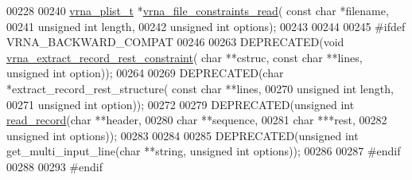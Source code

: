 \begin{DoxyCode}
00228 
00240 \hyperlink{group__data__structures_structvrna__plist__s}{vrna\_plist\_t} *\hyperlink{group__file__utils_gae33323c53765ecbbc410d9de2d495432}{vrna\_file\_constraints\_read}( \textcolor{keyword}{const} \textcolor{keywordtype}{char} *filename,
00241                                           \textcolor{keywordtype}{unsigned} \textcolor{keywordtype}{int} length,
00242                                           \textcolor{keywordtype}{unsigned} \textcolor{keywordtype}{int} options);
00243 
00244 
00245 \textcolor{preprocessor}{#ifdef  VRNA\_BACKWARD\_COMPAT}
00246 
00263 DEPRECATED(\textcolor{keywordtype}{void} \hyperlink{group__file__utils_ga55a9ae6dfeecc1b3f0c2acf6fa796c15}{vrna\_extract\_record\_rest\_constraint}( \textcolor{keywordtype}{char} **cstruc, \textcolor{keyword}{
      const} \textcolor{keywordtype}{char} **lines, \textcolor{keywordtype}{unsigned} \textcolor{keywordtype}{int} option));
00264 
00269 DEPRECATED(\textcolor{keywordtype}{char} *extract\_record\_rest\_structure( \textcolor{keyword}{const} \textcolor{keywordtype}{char} **lines,
00270                                                 \textcolor{keywordtype}{unsigned} \textcolor{keywordtype}{int} length,
00271                                                 \textcolor{keywordtype}{unsigned} \textcolor{keywordtype}{int} option));
00272 
00279 DEPRECATED(\textcolor{keywordtype}{unsigned} \textcolor{keywordtype}{int} \hyperlink{group__file__utils_gafd194a69af9d92b5b0412a7627ac1595}{read\_record}(\textcolor{keywordtype}{char} **header,
00280                                     \textcolor{keywordtype}{char} **sequence,
00281                                     \textcolor{keywordtype}{char}  ***rest,
00282                                     \textcolor{keywordtype}{unsigned} \textcolor{keywordtype}{int} options));
00283 
00284 
00285 DEPRECATED(\textcolor{keywordtype}{unsigned} \textcolor{keywordtype}{int} get\_multi\_input\_line(\textcolor{keywordtype}{char} **\textcolor{keywordtype}{string}, \textcolor{keywordtype}{unsigned} \textcolor{keywordtype}{int} options));
00286 
00287 \textcolor{preprocessor}{#endif}
00288 
00293 \textcolor{preprocessor}{#endif}
\end{DoxyCode}
